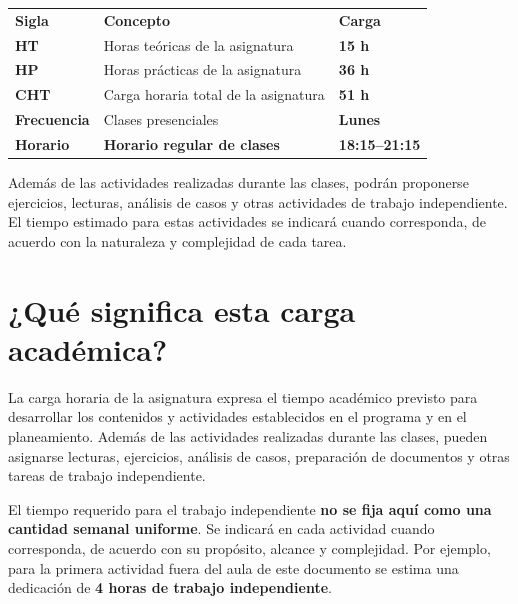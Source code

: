 \documentclass[10pt]{article}
\begin{document}
\begin{center}
\renewcommand{\arraystretch}{1.3}

\begin{tabularx}{\textwidth}{
    >{\centering\arraybackslash}p{1.7cm}
    X
    >{\centering\arraybackslash}p{2.5cm}
}

\rowcolor{calAzul}
\color{white}\textbf{Sigla} &
\color{white}\textbf{Concepto} &
\color{white}\textbf{Carga} \\

\rowcolor{calAzulClaro}
\textbf{HT} &
Horas teóricas de la asignatura &
\textbf{15 h} \\

\rowcolor{calVerdeClaro}
\textbf{HP} &
Horas prácticas de la asignatura &
\textbf{36 h} \\

\rowcolor{calAmarilloClaro}
\textbf{CHT} &
Carga horaria total de la asignatura &
\textbf{51 h} \\

\rowcolor{calGrisClaro}
\textbf{Frecuencia} &
Clases presenciales &
\textbf{Lunes} \\

\rowcolor{calAzul}
\color{white}\textbf{Horario} &
\color{white}\textbf{Horario regular de clases} &
\color{white}\textbf{18:15--21:15} \\

\end{tabularx}
\end{center}

Además de las actividades realizadas durante las clases, podrán proponerse
ejercicios, lecturas, análisis de casos y otras actividades de trabajo
independiente. El tiempo estimado para estas actividades se indicará cuando
corresponda, de acuerdo con la naturaleza y complejidad de cada tarea.
\section{¿Qué significa esta carga académica?}

La carga horaria de la asignatura expresa el tiempo académico previsto
para desarrollar los contenidos y actividades establecidos en el programa
y en el planeamiento. Además de las actividades realizadas durante las
clases, pueden asignarse lecturas, ejercicios, análisis de casos,
preparación de documentos y otras tareas de trabajo independiente.

El tiempo requerido para el trabajo independiente \textbf{no se fija aquí
como una cantidad semanal uniforme}. Se indicará en cada actividad cuando
corresponda, de acuerdo con su propósito, alcance y complejidad. Por
ejemplo, para la primera actividad fuera del aula de este documento se
estima una dedicación de \textbf{4 horas de trabajo independiente}.
\end{document}
